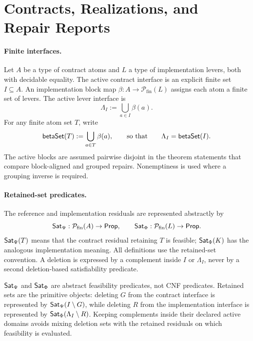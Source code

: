 \section{Contracts, Realizations, and Repair Reports}
\label{sec:contracts}

\paragraph{Finite interfaces.}
Let \(A\) be a type of contract atoms and \(L\) a type of implementation
levers, both with decidable equality.  The active contract interface is an
explicit finite set \(I \subseteq A\).  An implementation block map
\(\beta : A \to \mathcal{P}_{\mathrm{fin}}(L)\) assigns each atom a finite set
of levers.  The active lever interface is
\[
  \Lambda_I := \bigcup_{a \in I} \beta(a).
\]
For any finite atom set \(T\), write
\[
  \mathsf{betaSet}(T) := \bigcup_{a \in T}\beta(a),
  \qquad\text{so that}\qquad
  \Lambda_I=\mathsf{betaSet}(I).
\]
The active blocks are assumed pairwise disjoint in the theorem statements that
compare block-aligned and grouped repairs.  Nonemptiness is used where a
grouping inverse is required.

\paragraph{Retained-set predicates.}
The reference and implementation residuals are represented abstractly by
\[
  \mathsf{Sat}_{\Psi} : \mathcal{P}_{\mathrm{fin}}(A) \to \mathsf{Prop},
  \qquad
  \mathsf{Sat}_{\Phi} : \mathcal{P}_{\mathrm{fin}}(L) \to \mathsf{Prop}.
\]
\(\mathsf{Sat}_{\Psi}(T)\) means that the contract residual retaining \(T\) is feasible;
\(\mathsf{Sat}_{\Phi}(K)\) has the analogous implementation meaning.  All definitions use
the retained-set convention.  A deletion is expressed by a complement inside
\(I\) or \(\Lambda_I\), never by a second deletion-based satisfiability
predicate.

\(\mathsf{Sat}_{\Psi}\) and \(\mathsf{Sat}_{\Phi}\) are abstract feasibility predicates, not CNF
predicates.  Retained sets are the primitive objects: deleting \(G\) from the
contract interface is represented by \(\mathsf{Sat}_{\Psi}(I\setminus G)\), while deleting
\(R\) from the implementation interface is represented by
\(\mathsf{Sat}_{\Phi}(\Lambda_I\setminus R)\).  Keeping complements inside their declared
active domains avoids mixing deletion sets with the retained residuals on
which feasibility is evaluated.

